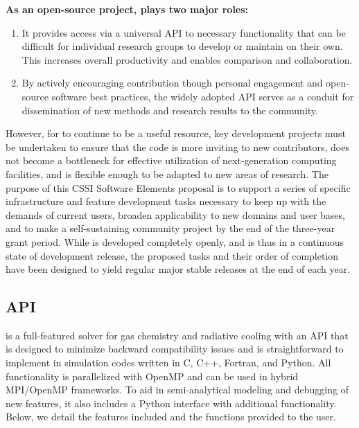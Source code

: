 \noindent
{\bf As an open-source project, \grackle{} plays two major roles:}
\begin{enumerate}
\item It provides access via a universal API to necessary functionality
that can be difficult for individual research groups to develop or
maintain on their own.  This increases overall productivity and
enables comparison and collaboration.
\item By actively encouraging contribution though personal engagement
and open-source software best practices, the widely adopted API serves
as a conduit for dissemination of new methods and research results to
the community.
\end{enumerate}
However, for \grackle{} to continue to be a useful resource, key
development projects must be undertaken to ensure that the code is
more inviting to new contributors, does not become a bottleneck
for effective utilization of next-generation computing facilities, 
and is flexible enough to be adapted to new areas of research.
The purpose of this CSSI Software Elements proposal is to support a
series of specific infrastructure and feature development tasks
necessary to keep up with the demands of current users, broaden
applicability to new domains and user bases, and to make \grackle{} a
self-sustaining community project by the end of the 
three-year grant period.  While \grackle{} is developed completely openly, and
is thus in a continuous state of development release, the proposed tasks and their order of
completion have been designed to yield regular major stable releases at
the end of each year.

\subsection{\grackle{} API}\label{sec:arch}

\grackle{} is a full-featured solver for gas chemistry and radiative
cooling with an API that is designed to minimize backward
compatibility issues and is straightforward to implement in simulation
codes written in C, C++, Fortran, and Python.  All functionality is
parallelized with OpenMP and can be used in hybrid MPI/OpenMP
frameworks.  To aid in semi-analytical
modeling and debugging of new features, it also includes a Python
interface with additional functionality.  Below, we detail the
features included and the functions provided to the user.

